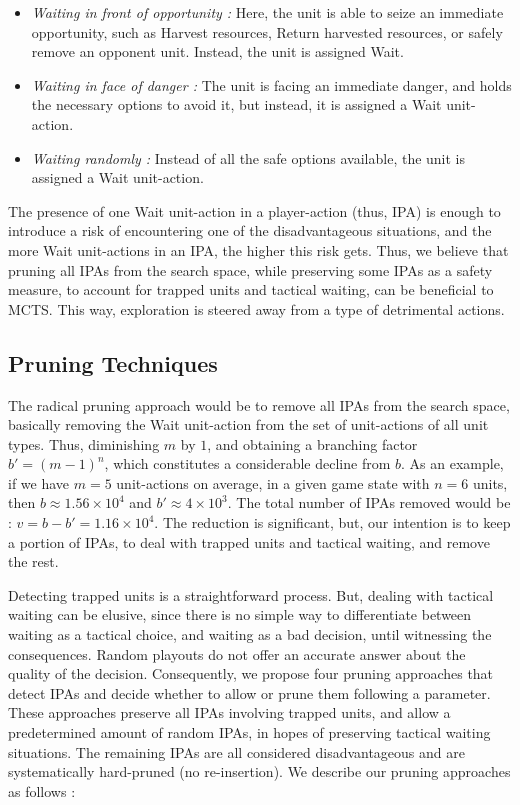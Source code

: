 \documentclass[conference]{IEEEtran}
\begin{document}
\begin{itemize}
\item \textit{Waiting in front of opportunity :} Here, the unit is able to seize an immediate opportunity, such as Harvest resources, Return harvested resources, or safely remove an opponent unit. Instead, the unit is assigned Wait.
\item \textit{Waiting in face of danger :} The unit is facing an immediate danger, and holds the necessary options to avoid it, but instead, it is assigned a Wait unit-action.
\item \textit{Waiting randomly :} Instead of all the safe options available, the unit is assigned a Wait unit-action.
\end{itemize}

The presence of one Wait unit-action in a player-action (thus, IPA) is enough to introduce a risk of encountering one of the disadvantageous situations, and the more Wait unit-actions in an IPA, the higher this risk gets. Thus, we believe that pruning all IPAs from the search space, while preserving some IPAs as a safety measure, to account for trapped units and tactical waiting, can be beneficial to MCTS. This way, exploration is steered away from a type of detrimental actions.


\subsection{Pruning Techniques}

The radical pruning approach would be to remove all IPAs from the search space, basically removing the Wait unit-action from the set of unit-actions of all unit types. Thus, diminishing $m$ by $1$, and obtaining a branching factor $b' = (m - 1)^n$, which constitutes a considerable decline from $b$. As an example, if we have $m=5$ unit-actions on average, in a given game state with $n=6$ units, then $b \approx 1.56\times10^4$ and $b' \approx 4\times10^3$. The total number of IPAs removed would be : $v = b - b' = 1.16\times10^4$. The reduction is significant, but, our intention is to keep a portion of IPAs, to deal with trapped units and tactical waiting, and remove the rest.

Detecting trapped units is a straightforward process. But, dealing with tactical waiting can be elusive, since there is no simple way to differentiate between waiting as a tactical choice, and waiting as a bad decision, until witnessing the consequences. Random playouts do not offer an accurate answer about the quality of the decision. Consequently, we propose four pruning approaches that detect IPAs and decide whether to allow or prune them following a parameter. These approaches preserve all IPAs involving trapped units, and allow a predetermined amount of random IPAs, in hopes of preserving tactical waiting situations. The remaining IPAs are all considered disadvantageous and are systematically hard-pruned (no re-insertion). We describe our pruning approaches as follows :
\end{document}

